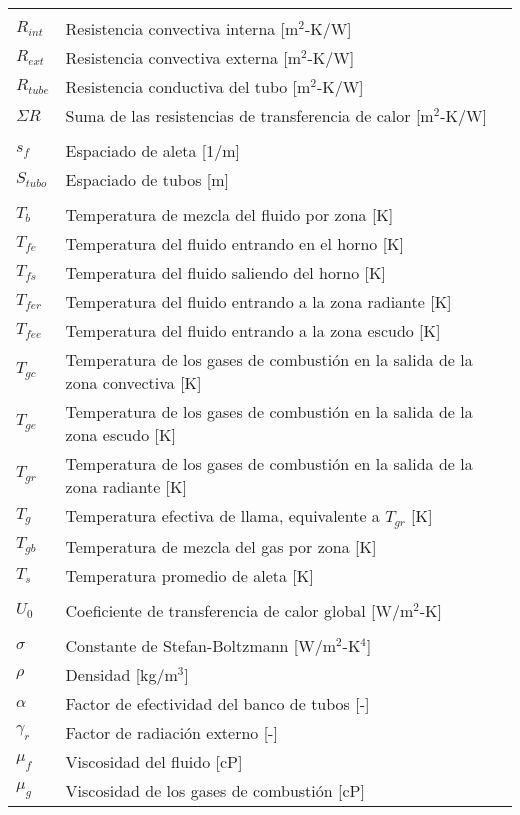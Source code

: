 \begin{tabular}{ll}
\\
\\
$R_{int}$  & Resistencia convectiva interna [m$^2$-K/W]\\
$R_{ext}$  & Resistencia convectiva externa [m$^2$-K/W] \\
$R_{tube}$ & Resistencia conductiva del tubo [m$^2$-K/W]\\
$\Sigma R$ & Suma de las resistencias de transferencia de calor [m$^2$-K/W]\\
\\
$s_f$      & Espaciado de aleta [1/m]\\
$S_{tubo}$ & Espaciado de tubos [m] \\
\\
$T_b$ & Temperatura de mezcla del fluido por zona [K] \\
$T_{fe}$& Temperatura del fluido entrando en el horno [K] \\
$T_{fs}$& Temperatura del fluido saliendo del horno [K] \\
$T_{fer}$& Temperatura del fluido entrando a la zona radiante [K] \\
$T_{fee}$& Temperatura del fluido entrando a la zona escudo [K] \\
$T_{gc}$& Temperatura de los gases de combustión en la salida de la zona convectiva [K] \\
$T_{ge}$& Temperatura de los gases de combustión en la salida de la zona escudo [K] \\
$T_{gr}$& Temperatura de los gases de combustión en la salida de la zona radiante [K] \\
$T_g$   & Temperatura efectiva de llama, equivalente a $T_{gr}$ [K] \\
$T_{gb}$& Temperatura de mezcla del gas por zona [K] \\
$T_s$ & Temperatura promedio de aleta [K]\\
\\
$U_0$ & Coeficiente de transferencia de calor global [W/m$^2$-K] \\
\\
$\sigma$    & Constante de Stefan-Boltzmann [W/m$^2$-K$^4$] \\
$\rho$      & Densidad [kg/m$^3$] \\
$\alpha$    & Factor de efectividad del banco de tubos [-]\\
$\gamma_r$  & Factor de radiación externo [-] \\
$\mu_f$     & Viscosidad del fluido [cP] \\
$\mu_g$     & Viscosidad de los gases de combustión [cP] \\
\end{tabular}
